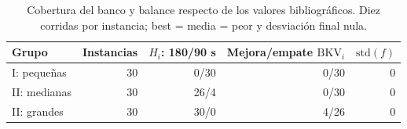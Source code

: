 \begin{table}[tbp]\centering\small
\caption{Cobertura del banco y balance respecto de los valores bibliográficos. Diez corridas por instancia; best = media = peor y desviación final nula.}
\label{tab:cohort-results}
\begin{tabular}{lrrrr}
\toprule
Grupo & Instancias & $H_i$: 180/90 s & Mejora/empate $\mathrm{BKV}_i$ & $\mathrm{std}(f)$\\
\midrule
I: pequeñas & 30 & 0/30 & 0/30 & 0\\
II: medianas & 30 & 26/4 & 0/30 & 0\\
II: grandes & 30 & 30/0 & 4/26 & 0\\
\bottomrule\end{tabular}
\end{table}
